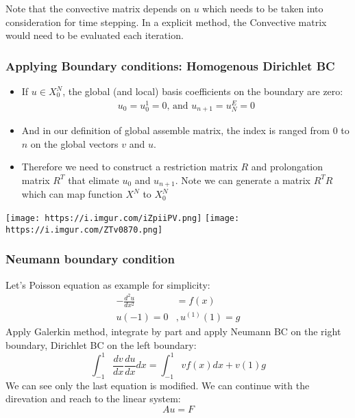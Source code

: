\documentclass[
  a4paper,
  10pt]{article}
\begin{document}
Note that the convective matrix depends on \(u\) which needs to be taken
into consideration for time stepping. In a explicit method, the
Convective matrix would need to be evaluated each iteration.

\hypertarget{applying-boundary-conditions-homogenous-dirichlet-bc}{%
\subsubsection{Applying Boundary conditions: Homogenous Dirichlet
BC}\label{applying-boundary-conditions-homogenous-dirichlet-bc}}

\begin{itemize}
\item
  If \(u\in X_0^{N}\), the global (and local) basis coefficients on the
  boundary are zero: \begin{align}
  u_0 = u_0^1 = 0 \text{, and }u_{n+1} = u_N^E = 0
  \end{align}
\item
  And in our definition of global assemble matrix, the index is ranged
  from 0 to \(n\) on the global vectors \(v\) and \(u\).
\item
  Therefore we need to construct a restriction matrix \(R\) and
  prolongation matrix \(R^T\) that elimate \(u_0\) and \(u_{n+1}\). Note
  we can generate a matrix \(R^TR\) which can map function \(X^N\) to
  \(X^N_0\)
\end{itemize}

\texttt{[image: https://i.imgur.com/iZpiiPV.png]}
\texttt{[image: https://i.imgur.com/ZTv0870.png]}

\hypertarget{neumann-boundary-condition}{%
\subsubsection{Neumann boundary
condition}\label{neumann-boundary-condition}}

Let's Poisson equation as example for simplicity: \begin{align}
-\frac{d^2u}{dx^2} &= f(x)\\
u(-1) = 0&,u^{(1)}(1)=g
\end{align} Apply Galerkin method, integrate by part and apply Neumann
BC on the right boundary, Dirichlet BC on the left boundary:
\begin{equation}
\int_{-1}^1\frac{dv}{dx}\frac{du}{dx}dx = \int_{-1}^1 vf(x)dx+v(1)g
\end{equation} We can see only the last equation is modified. We can
continue with the direvation and reach to the linear system:
\begin{equation}
Au=F
\end{equation}
\end{document}
